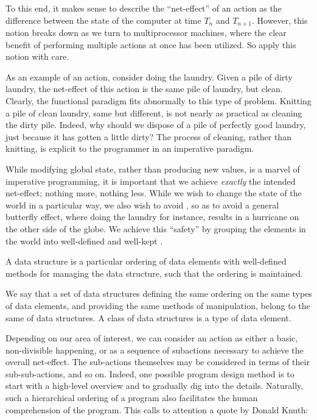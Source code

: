 To this end, it makes sense to describe the ``net-effect'' of an action as the
difference between the state of the computer at time $T_n$ and $T_{n+1}$.
However, this notion breaks down as we turn to multiprocessor machines, where
the clear benefit of performing multiple actions at once has been utilized. So
apply this notion with care.


As an example of an action, consider doing the laundry. Given a pile of dirty
laundry, the net-effect of this action is the same pile of laundry, but clean.
Clearly, the functional paradigm fits abnormally to this type of problem.
Knitting a pile of clean laundry, same but different, is not nearly as
practical as cleaning the dirty pile. Indeed, why should we dispose of a pile
of perfectly good laundry, just because it has gotten a little dirty? The
process of cleaning, rather than knitting, is explicit to the programmer in an
imperative paradigm.

While modifying global state, rather than producing new values, is a marvel of
imperative programming, it is important that we achieve \emph{exactly} the
intended net-effect; nothing more, nothing less. While we wish to change the
state of the world in a particular way, we also wish to avoid
, so as to avoid a general butterfly effect, where doing the
laundry for instance, results in a hurricane on the other side of the globe.
We achieve this ``safety'' by grouping the elements in the world into
well-defined and well-kept .

\begin{definition}

A data structure is a particular ordering of data elements with well-defined
methods for managing the data structure, such that the ordering is maintained.

\end{definition}

We say that a set of data structures defining the same ordering on the same
types of data elements, and providing the same methods of manipulation, belong
to the same  of data structures. A class of data structures is a
type of data element\footnotemark.


Depending on our area of interest, we can consider an action as either a basic,
non-divisible happening, or as a sequence of subactions necessary to achieve
the overall net-effect. The sub-actions themselves may be considered in terms
of their sub-sub-actions, and so on. Indeed, one possible program design method
is to start with a high-level overview and to gradually dig into the details.
Naturally, such a hierarchical ordering of a program also facilitates the human
comprehension of the program. This calls to attention a quote by Donald
Knuth\cite{knuth-review-of-sp}:

